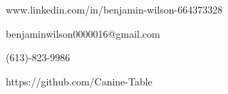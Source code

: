 \begin{ColorThemedBox}[1][2][title=Contact Information]\relax%
	\begin{ColorThemedBox}[0][2]\relax%
		\faLinkedin\hspace{12pt}www.linkedin.com/in/benjamin-wilson-664373328\par\smallskip%
		\faMailBulk\hspace{9pt}benjaminwilson0000016@gmail.com\par\smallskip%
		\faPhone*\hspace{10pt}(613)-823-9986\par\smallskip%
		\faGithub\hspace{10pt}https://github.com/Canine-Table\smallskip%
	\end{ColorThemedBox}%
\end{ColorThemedBox}%
\\

